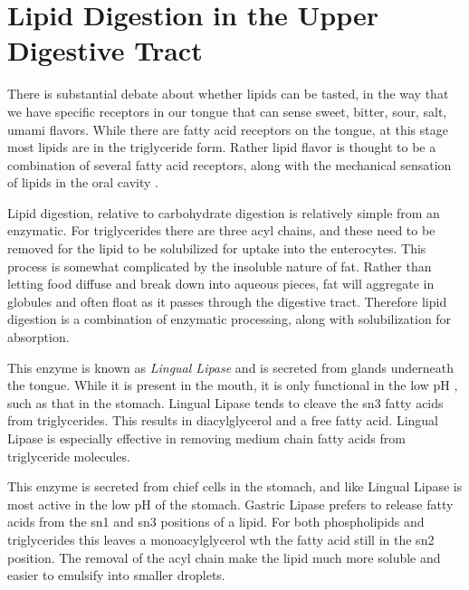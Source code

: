 \documentclass{tufte-handout}
\begin{document}
\section{Lipid Digestion in the Upper Digestive Tract}

There is substantial debate about whether lipids can be tasted, in the way that we have specific receptors in our tongue that can sense sweet, bitter, sour, salt, umami flavors.  While there are fatty acid receptors on the tongue, at this stage most lipids are in the triglyceride form.  Rather lipid flavor is thought to be a combination of several fatty acid receptors, along with the mechanical sensation of lipids in the oral cavity \citep{DiPatrizio2014}.

Lipid digestion, relative to carbohydrate digestion is relatively simple from an enzymatic.  For triglycerides there are three acyl chains, and these need to be removed for the lipid to be solubilized for uptake into the enterocytes.  This process is somewhat complicated by the insoluble nature of fat.  Rather than letting food diffuse and break down into aqueous pieces, fat will aggregate in globules and often float as it passes through the digestive tract.  Therefore lipid digestion is a combination of enzymatic processing, along with solubilization for absorption.

  This enzyme is known as \emph{Lingual Lipase} and is secreted from glands underneath the tongue.  While it is present in the mouth, it is only functional in the low pH , such as that in the stomach.  Lingual Lipase tends to cleave the sn3 fatty acids from triglycerides.  This results in diacylglycerol and a free fatty acid. Lingual Lipase is especially effective in removing medium chain fatty acids from triglyceride molecules\citep{Jensen1983}.

  This enzyme is secreted from chief cells in the stomach, and like Lingual Lipase is most active in the low pH of the stomach.  Gastric Lipase prefers to release fatty acids from the sn1 and sn3 positions of a lipid.  For both phospholipids and triglycerides this leaves a monoacylglycerol wth the fatty acid still in the sn2 position.  The removal of the acyl chain make the lipid much more soluble and easier to emulsify into smaller droplets.
\end{document}
